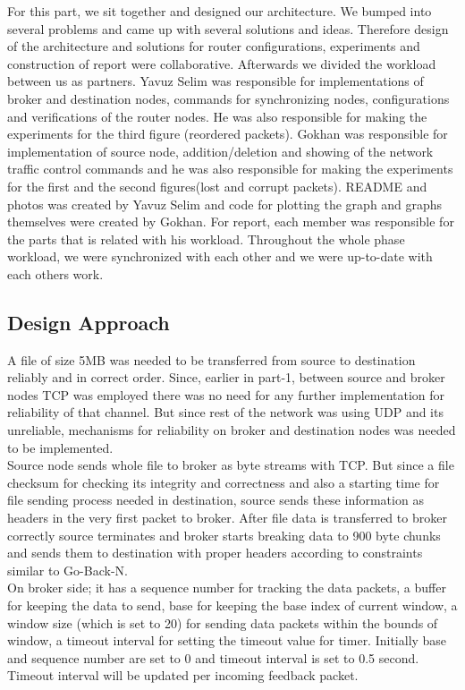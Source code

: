 \documentclass[conference]{IEEEtran}
\begin{document}
For this part, we sit together and designed our architecture. We bumped into several problems and came up with several solutions and ideas. Therefore design of the architecture and solutions for router configurations, experiments and construction of report were collaborative. Afterwards we divided the workload between us as partners. Yavuz Selim was responsible for implementations of broker and destination nodes, commands for synchronizing nodes, configurations and verifications of the router nodes. He was also responsible for making the experiments for the third figure (reordered packets). Gokhan was responsible for implementation of source node, addition/deletion and showing of the network traffic control commands and he was also responsible for making the experiments for the first and the second figures(lost and corrupt packets). README and photos was created by Yavuz Selim and code for plotting the graph and graphs themselves were created by Gokhan. For report, each member was responsible for the parts that is related with his workload. Throughout the whole phase workload, we were synchronized with each other and we were up-to-date with each others work.

\subsection{Design Approach}
A file of size 5MB was needed to be transferred from source to destination reliably and in correct order. Since, earlier in part-1, between source and broker nodes TCP was employed there was no need for any further implementation for reliability of that channel. But since rest of the network was using UDP and its unreliable, mechanisms for reliability on broker and destination nodes was needed to be implemented. \\

Source node sends whole file to broker as byte streams with TCP. But since a file checksum for checking its integrity and correctness and also a starting time for file sending process needed in destination, source sends these information as headers in the very first packet to broker. After file data is transferred to broker correctly source terminates and broker starts breaking data to 900 byte chunks and sends them to destination with proper headers according to constraints similar to Go-Back-N. \\

On broker side; it has a sequence number for tracking the data packets, a buffer for keeping the data to send, base for keeping the base index of current window, a window size (which is set to 20) for sending data packets within the bounds of window, a timeout interval for setting the timeout value for timer. Initially base and sequence number are set to 0 and timeout interval is set to 0.5 second. Timeout interval will be updated per incoming feedback packet. \\
\end{document}
